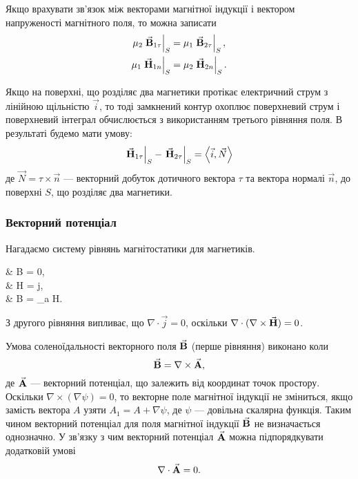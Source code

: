 Якщо врахувати зв'язок між векторами магнітної індукції і вектором напруженості магнітного поля, то можна записати
\begin{align}
	\mu_2 \left. {\vec{\mathbf{B}}}_{1\tau} \right|_S &= \mu_1 \left. {\vec{\mathbf{B}}}_{2\tau} \right|_S, \\
	\mu_1 \left. {\vec{\mathbf{H}}}_{1n} \right|_S &= \mu_2 \left. {\vec{\mathbf{H}}}_{2n} \right|_S.
\end{align}

Якщо на поверхні, що розділяє два магнетики протікає електричний струм з лінійною щільністю $\vec i$, то тоді замкнений контур охоплює поверхневий струм і поверхневий інтеграл обчислюється з використанням третього рівняння поля. В результаті будемо мати умову:
\begin{equation}
	\left. \vecf H_{1\tau} \right|_S - \left. \vecf H_{2\tau} \right|_S = \langle \vec i, \vec N \rangle
\end{equation}
де $\vec N = \tau \times \vec n$ --- векторний добуток дотичного вектора $\tau$ та вектора нормалі $\vec n$, до поверхні $S$, що розділяє два магнетики.

\subsubsection{Векторний потенціал}

Нагадаємо систему рівнянь магнітостатики для магнетиків.
\begin{system}
	& \nabla \cdot \vecf B = 0, \\
	& \nabla \times \vecf H = \vec j, \\
	& \vecf B = \mu_a \vecf H.
\end{system}

З другого рівняння випливає, що $\nabla \cdot \vec j = 0$, оскільки $\nabla \cdot (\nabla \times {\vec{\mathbf{H}}}) = 0$. \medskip

Умова соленоїдальності векторного поля ${\vec{\mathbf{B}}}$ (перше рівняння) виконано коли
\begin{equation}
	{\vec{\mathbf{B}}} = \nabla \times {\vec{\mathbf{A}}},
\end{equation}
де ${\vec{\mathbf{A}}}$ --- векторний потенціал, що залежить від координат точок простору. Оскільки $\nabla \times (\nabla \psi) = 0$, то векторне поле магнітної індукції не зміниться, якщо замість вектора $A$ узяти $A_1 = A + \nabla \psi$, де $\psi$ --- довільна скалярна функція. Таким чином векторний потенціал для поля магнітної індукції ${\vec{\mathbf{B}}}$ не визначається однозначно. У зв'язку з чим векторний потенціал ${\vec{\mathbf{A}}}$ можна підпорядкувати додатковій умові
\begin{equation}
	\nabla \cdot {\vec{\mathbf{A}}} = 0.	
\end{equation}

